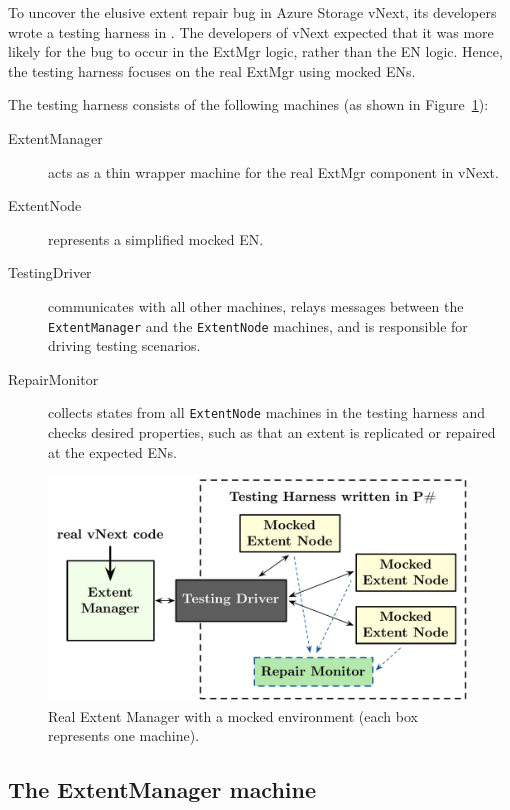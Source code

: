 To uncover the elusive extent repair bug in Azure Storage vNext, its developers wrote a testing harness in \psharp. The developers of vNext expected that it was more likely for the bug to occur in the ExtMgr logic, rather than the EN logic. Hence, the testing harness focuses on the real ExtMgr using mocked ENs.

The testing harness consists of the following \psharp machines (as shown in Figure~\ref{fig:azurestoremodel}):
\begin{description}
\item[ExtentManager] acts as a thin wrapper machine for the real ExtMgr component in vNext.

\item[ExtentNode] represents a simplified mocked EN.

\item[TestingDriver] communicates with all other machines, relays messages between the \texttt{ExtentManager} and the \texttt{ExtentNode} machines, and is responsible for driving testing scenarios.

\item[RepairMonitor] collects states from all \texttt{ExtentNode} machines in the testing harness and checks desired properties, such as that an extent is replicated or repaired at the expected ENs.
\end{description}

\begin{figure}[t]
\centering
\includegraphics[width=\linewidth]{img/mocked_vnext}
\caption{Real Extent Manager with a mocked environment (each box represents one \psharp machine).}
\label{fig:azurestoremodel}
\end{figure}

\subsection{The ExtentManager machine}
\label{sec:method:wrap_target}

